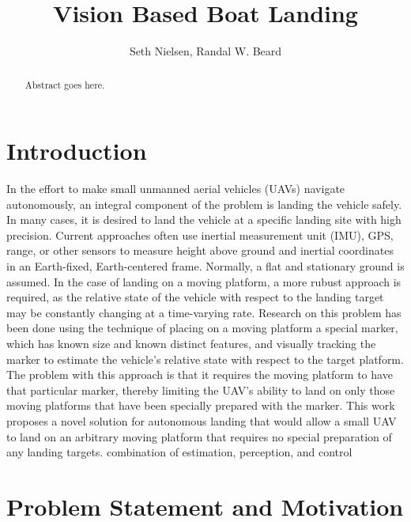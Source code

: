 \documentclass{article}
\title{\LARGE \bf
    Vision Based Boat Landing
}
\author{
    Seth Nielsen, Randal W. Beard 
}
\begin{document}
\maketitle

\begin{abstract}

Abstract goes here.

\end{abstract}

\section{Introduction}

In the effort to make small unmanned aerial vehicles (UAVs) navigate autonomously, an integral component of the problem is landing the vehicle safely. In many cases, it is desired to land the vehicle at a specific landing site with high precision. Current approaches often use inertial measurement unit (IMU), GPS, range, or other sensors to measure height above ground and inertial coordinates in an Earth-fixed, Earth-centered frame. Normally, a flat and stationary ground is assumed. In the case of landing on a moving platform, a more rubust approach is required, as the relative state of the vehicle with respect to the landing target may be constantly changing at a time-varying rate. Research on this problem has been done using the technique of placing on a moving platform a special marker, which has known size and known distinct features, and visually tracking the marker to estimate the vehicle's relative state with respect to the target platform. The problem with this approach is that it requires the moving platform to have that particular marker, thereby limiting the UAV's ability to land on only those moving platforms that have been specially prepared with the marker. This work proposes a novel solution for autonomous landing that would allow a small UAV to land on an arbitrary moving platform that requires no special preparation of any landing targets.  combination of estimation, perception, and control 


\section{Problem Statement and Motivation}

\end{document}
